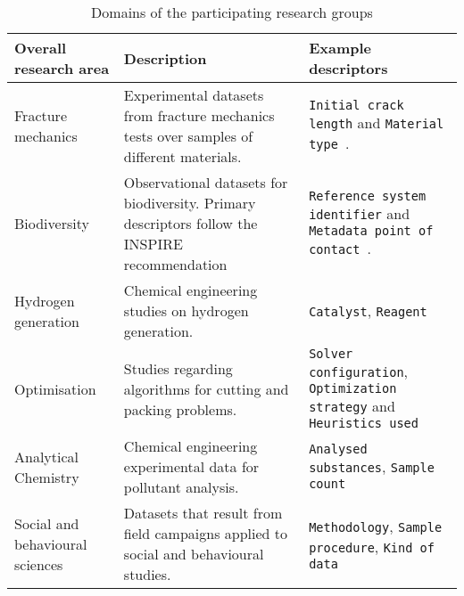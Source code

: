 \begin{table*}
\centering
\caption{Domains of the participating research groups}
\label{tab:domains_and_descriptors}
\begin{tabular}{|p{}|p{}|p{}|}
\hline
\textbf{Overall research area}                         & \textbf{Description}                                                                                                        & \textbf{Example descriptors}                                                                                                                                           \\ \hline
Fracture mechanics              & Experimental datasets from fracture mechanics tests over samples of different materials.                           & \texttt{Initial crack length} and \texttt{Material type}~\cite{CastroJ.2013}.     \\ \hline
Biodiversity                    & Observational datasets for biodiversity. Primary descriptors follow the INSPIRE recommendation~\cite{Bartha2011} & \texttt{Reference system identifier} and \texttt{Metadata point of contact}~\cite{Rochab}. \\ \hline
Hydrogen generation             & Chemical engineering studies on hydrogen generation.                                                                & \texttt{Catalyst}, \texttt{Reagent}                                                                                                                    \\ \hline
Optimisation                    & Studies regarding algorithms for cutting and packing problems.                                                      & \texttt{Solver configuration}, \texttt{Optimization strategy} and \texttt{Heuristics used}                                                              \\ \hline
Analytical Chemistry            & Chemical engineering experimental data for pollutant analysis.                                                      & \texttt{Analysed substances}, \texttt{Sample count}                                                                                                       \\ \hline
Social and behavioural sciences & Datasets that result from field campaigns applied to social and behavioural studies.                                & \texttt{Methodology}, \texttt{Sample procedure}, \texttt{Kind of data}                                                                                  \\ \hline

\end{tabular}
\end{table*}
